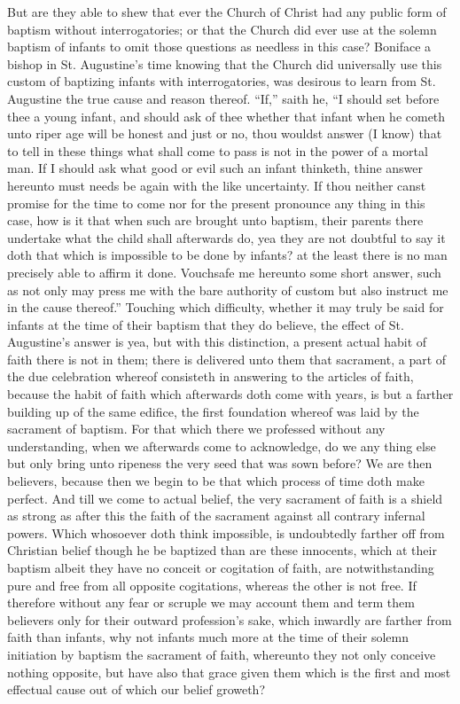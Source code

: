 But are they able to shew that ever the Church of Christ had any public form of baptism without interrogatories; or that the Church did ever use at the solemn baptism of infants to omit those questions as needless in this case? Boniface a bishop in St. Augustine’s time knowing that the Church did universally use this custom of baptizing infants with interrogatories, was desirous to learn from St. Augustine the true cause and reason thereof. “If,” saith he, “I should set before thee a young infant, and should ask of  thee whether that infant when he cometh unto riper age will be honest and just or no, thou wouldst answer (I know) that to tell in these things what shall come to pass is not in the power of a mortal man. If I should ask what good or evil such an infant thinketh, thine answer hereunto must needs be again with the like uncertainty. If thou neither canst promise for the time to come nor for the present pronounce any thing in this case, how is it that when such are brought unto baptism, their parents there undertake what the child shall afterwards do, yea they are not doubtful to say it doth that which is impossible to be done by infants? at the least there is no man precisely able to affirm it done. Vouchsafe me hereunto some short answer, such as not only may press me with the bare authority of custom but also instruct me in the cause thereof.”
Touching which difficulty, whether it may truly be said for infants at the time of their baptism that they do believe, the effect of St. Augustine’s answer is yea, but with this distinction, a present actual habit of faith there is not in them;  there is delivered unto them that sacrament, a part of the due celebration whereof consisteth in answering to the articles of faith, because the habit of faith which afterwards doth come with years, is but a farther building up of the same edifice, the first foundation whereof was laid by the sacrament of baptism. For that which there we professed without any understanding, when we afterwards come to acknowledge, do we any thing else but only bring unto ripeness the very seed that was sown before? We are then believers, because then we begin to be that which process of time doth make perfect. And till we come to actual belief, the very sacrament of faith is a shield as strong as after this the faith of the sacrament against all contrary infernal powers. Which whosoever doth think impossible, is undoubtedly farther off from Christian belief though he be baptized than are these innocents, which at their baptism albeit they have no conceit or cogitation of faith, are notwithstanding pure and free from all opposite cogitations, whereas the other is not free. If therefore without any fear or scruple we may account them and term them believers only for their outward profession’s sake, which inwardly are farther from faith than infants, why not infants much more at the time of their solemn initiation by baptism the sacrament of faith, whereunto they not only conceive nothing opposite, but have also that grace given them  which is the first and most effectual cause out of which our belief groweth?
